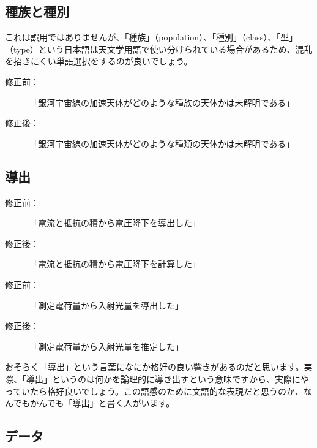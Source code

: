 \subsection{種族と種別}

これは誤用ではありませんが、「種族」（population）、「種別」（class）、「型」（type）という日本語は天文学用語で使い分けられている場合があるため、混乱を招きにくい単語選択をするのが良いでしょう。

\begin{description}
\item[修正前：]「銀河宇宙線の加速天体がどのような種族の天体かは未解明である」
\item[修正後：]「銀河宇宙線の加速天体がどのような種類の天体かは未解明である」
\end{description}




\subsection{導出}

\begin{description}
\item[修正前：]「電流と抵抗の積から電圧降下を導出した」
\item[修正後：]「電流と抵抗の積から電圧降下を計算した」
\end{description}
\begin{description}
\item[修正前：]「測定電荷量から入射光量を導出した」
\item[修正後：]「測定電荷量から入射光量を推定した」
\end{description}

おそらく「導出」という言葉になにか格好の良い響きがあるのだと思います。実際、「導出」というのは何かを論理的に導き出すという意味ですから、実際にやっていたら格好良いでしょう。この語感のために文語的な表現だと思うのか、なんでもかんでも「導出」と書く人がいます。

\subsection{データ}

